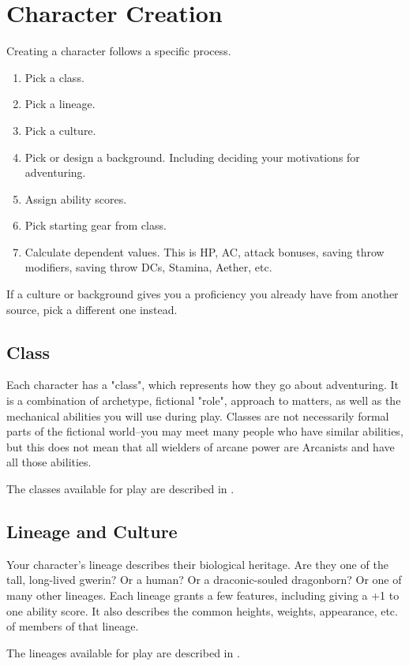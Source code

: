 \chapter{Character Creation}
\label{ch:character-creation}
Creating a character follows a specific process.
\begin{enumerate}
    \item Pick a class.
    \item Pick a lineage.
    \item Pick a culture.
    \item Pick or design a background. Including deciding your motivations for adventuring.
    \item Assign ability scores.
    \item Pick starting gear from class.
    \item Calculate dependent values. This is HP, AC, attack bonuses, saving throw modifiers, saving throw DCs, Stamina, Aether, etc.
\end{enumerate}

If a culture or background gives you a proficiency you already have from another source, pick a different one instead. 

\section{Class}
Each character has a "class", which represents how they go about adventuring. It is a combination of archetype, fictional "role", approach to matters, as well as the mechanical abilities you will use during play. Classes are not necessarily formal parts of the fictional world--you may meet many people who have similar abilities, but this does not mean that all wielders of arcane power are Arcanists and have all those abilities.

The classes available for play are described in .

\section{Lineage and Culture}
Your character's lineage describes their biological heritage. Are they one of the tall, long-lived gwerin? Or a human? Or a draconic-souled dragonborn? Or one of many other lineages. Each lineage grants a few features, including giving a +1 to one ability score. It also describes the common heights, weights, appearance, etc. of members of that lineage.

The lineages available for play are described in .

